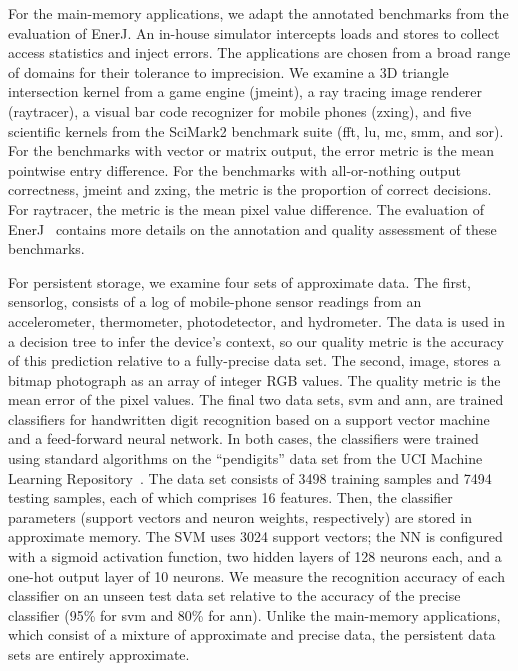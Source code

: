 \documentclass[prodmode,acmtocs]{acmsmall}
\begin{document}
For the main-memory applications, we adapt the annotated benchmarks
from the evaluation of EnerJ. An in-house simulator intercepts
loads and stores to collect access statistics and inject errors. The
applications are chosen from a broad range of domains for their tolerance to
imprecision. We examine a 3D triangle intersection kernel from a game engine
(\textsf{jmeint}), a ray tracing image renderer (\textsf{raytracer}), a visual
bar code recognizer for mobile phones (\textsf{zxing}), and five scientific
kernels from the SciMark2 benchmark suite (\textsf{fft}, \textsf{lu},
\textsf{mc}, \textsf{smm}, and \textsf{sor}).
For the benchmarks with vector or matrix
output, the error metric is the mean pointwise entry difference. For the
benchmarks with all-or-nothing output correctness, \textsf{jmeint} and
\textsf{zxing}, the metric is the proportion of correct decisions. For
\textsf{raytracer}, the metric is the mean pixel value difference.
The evaluation of EnerJ~\cite{enerj}
contains more details on the annotation and quality assessment of these
benchmarks.

For persistent storage, we examine four sets of approximate data. The first,
\textsf{sensorlog}, consists of a log of mobile-phone sensor readings from an
accelerometer, thermometer, photodetector, and hydrometer. The data is used in
a decision tree to infer the device's context, so our quality metric is the
accuracy of this prediction relative to a fully-precise data set.
The second, \textsf{image}, stores
a bitmap photograph as an array of integer RGB values. The quality metric is
the mean error of the pixel values.
The final two data sets, \textsf{svm} and \textsf{ann}, are trained
classifiers for handwritten digit recognition based on a support vector
machine and a feed-forward neural network. In both cases,
the classifiers were trained using standard algorithms on the ``pendigits''
data set from the UCI Machine Learning Repository~\cite{ucimlrepo}.
The data set consists of 3498 training samples and 7494 testing samples, each
of which comprises 16 features.
Then, the classifier
parameters (support vectors and neuron weights, respectively) are stored in
approximate memory.
The SVM uses 3024 support vectors; the NN is configured with a sigmoid
activation function, two hidden layers
of 128 neurons each, and a one-hot output layer of 10 neurons.
We measure the recognition accuracy of each classifier on
an unseen test data set relative to the accuracy of the precise classifier
(95\% for \textsf{svm} and 80\% for \textsf{ann}).
Unlike the main-memory applications, which consist of a mixture
of approximate and precise data,
the persistent data sets are entirely
approximate.
\end{document}
